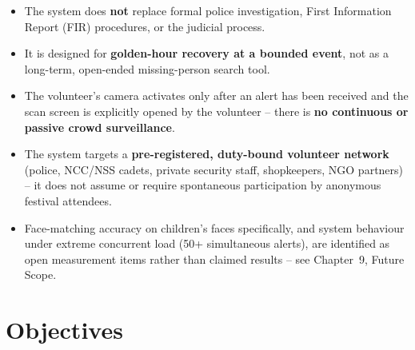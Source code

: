 \documentclass[12pt,a4paper,oneside]{report}
\begin{document}
\begin{itemize}
  \item The system does \textbf{not} replace formal police investigation,
        First Information Report (FIR) procedures, or the judicial process.
  \item It is designed for \textbf{golden-hour recovery at a bounded event},
        not as a long-term, open-ended missing-person search tool.
  \item The volunteer's camera activates only after an alert has been
        received and the scan screen is explicitly opened by the volunteer
        -- there is \textbf{no continuous or passive crowd surveillance}.
  \item The system targets a \textbf{pre-registered, duty-bound volunteer
        network} (police, NCC/NSS cadets, private security staff, shopkeepers,
        NGO partners) -- it does not assume or require spontaneous
        participation by anonymous festival attendees.
  \item Face-matching accuracy on children's faces specifically, and system
        behaviour under extreme concurrent load (50+ simultaneous alerts),
        are identified as open measurement items rather than claimed
        results -- see Chapter~9, Future Scope.
\end{itemize}

\section{Objectives}
\end{document}
